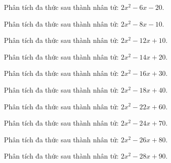 \begin{bt}
	Phân tích đa thức sau thành nhân tử: $2 x^2 - 6 x - 20$.
\end{bt}
\begin{bt}
	Phân tích đa thức sau thành nhân tử: $2 x^2 - 8 x - 10$.
\end{bt}
\begin{bt}
	Phân tích đa thức sau thành nhân tử: $2 x^2 - 12 x + 10$.
\end{bt}
\begin{bt}
	Phân tích đa thức sau thành nhân tử: $2 x^2 - 14 x + 20$.
\end{bt}
\begin{bt}
	Phân tích đa thức sau thành nhân tử: $2 x^2 - 16 x + 30$.
\end{bt}
\begin{bt}
	Phân tích đa thức sau thành nhân tử: $2 x^2 - 18 x + 40$.
\end{bt}
\begin{bt}
	Phân tích đa thức sau thành nhân tử: $2 x^2 - 22 x + 60$.
\end{bt}
\begin{bt}
	Phân tích đa thức sau thành nhân tử: $2 x^2 - 24 x + 70$.
\end{bt}
\begin{bt}
	Phân tích đa thức sau thành nhân tử: $2 x^2 - 26 x + 80$.
\end{bt}
\begin{bt}
	Phân tích đa thức sau thành nhân tử: $2 x^2 - 28 x + 90$.
\end{bt}
